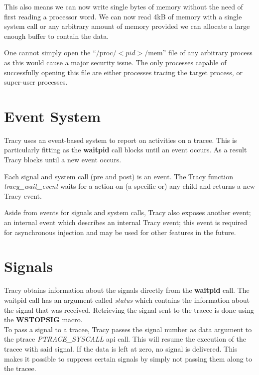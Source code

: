 \documentclass[a4paper, 10pt]{report}
\begin{document}
This also means we can now write single bytes of memory without the need
of first reading a processor word. We can now read 4kB of memory with a
single system call or any arbitrary amount of memory provided we can allocate
a large enough buffer to contain the data.

One cannot simply open the ``/proc/$<pid>$/mem'' file of any
arbitrary process as this would cause a major security issue. The only
processes capable of successfully opening this file are either processes
tracing the target process, or super-user processes.

\section{Event System}
\label{event-system}

Tracy uses an event-based system to report on activities on a tracee. This is
particularly fitting as the \textbf{waitpid} call blocks until an event
occurs. As a result Tracy blocks until a new event occurs.

Each signal and system call (pre and post) is an event.
The Tracy function \textit{tracy\_wait\_event} waits for a action on
(a specific or) any child and returns a new Tracy event.

Aside from events for signals and system calls, Tracy also exposes another
event; an internal event which describes an internal Tracy event; this event
is required for asynchronous injection and may be used for other features in
the future.

\section{Signals}

Tracy obtains information about the signals directly from the
\textbf{waitpid} call. The waitpid call has an argument called
\textit{status} which contains the information about the signal that was
received. Retrieving the signal sent to the tracee is done using the
\textbf{WSTOPSIG} macro. \\

To pass a signal to a tracee, Tracy passes the signal number as data
argument to the ptrace \textit{PTRACE\_SYSCALL} api call. This will
resume the execution of the tracee with said signal. If the data is
left at zero, no signal is delivered. This makes it possible to
suppress certain signals by simply not passing them along to the tracee.
\end{document}
